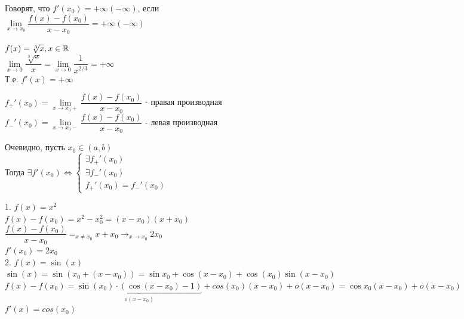 \begin{definition}
	Говорят, что $ f'(x_0) = +\infty (-\infty) $, если \\
	$ \lim\limits_{x \rightarrow x_0} \dfrac{f(x) - f(x_0)}{x - x_0} =  +\infty (-\infty) $
\end{definition}

\begin{example}
	$ f(x) = \sqrt[3]{x}, x \in \mathbb{R} $ \\
	$ \lim\limits_{x \rightarrow 0} \dfrac{\sqrt[3]{x}}{x} =  \lim\limits_{x \rightarrow 0} \dfrac{1}{x^{2/3}} = +\infty $ \\
	Т.е. $ f'(x) = +\infty $ 
\end{example}

\begin{definition}
	$ f_+' (x_0) = \lim\limits_{x \rightarrow x_0+} \dfrac{f(x) - f(x_0)}{x - x_0} $ - правая производная \\
	$ f_-' (x_0) = \lim\limits_{x \rightarrow x_0-} \dfrac{f(x) - f(x_0)}{x - x_0} $ - левая производная \\
\end{definition}

Очевидно, пусть $ x_0 \in (a, b) $ \\ %
Тогда  $ \exists f'(x_0) \Leftrightarrow \left\{ \begin{array}{ll}
	\exists f_+' (x_0) \\
	\exists f_-' (x_0) \\
	f_+' (x_0) = f_-' (x_0) 
\end{array} \right. $
\begin{example}
	1. $ f(x) = x^2 $ \\
	$ f(x) - f(x_0) = x^2 - x_0^2 = (x-x_0)(x+x_0) $ \\
	$  \dfrac{f(x) - f(x_0)}{x - x_0} =_{x \neq x_0} x + x_0 \rightarrow_{x \rightarrow x_0} 2x_0  $\\
	$ f'(x_0) = 2x_0 $ \\
	2. $ f(x) = \sin(x) $ \\
	$ \sin(x) = \sin(x_0 + (x - x_0))  = \sin x_0 + \cos(x - x_0) + \cos(x_0) \sin(x-x_0) $ \\
	$ f(x) - f(x_0) = \underbrace{\sin(x_0) \cdot (\cos(x-x_0) - 1)}_{o(x-x_0)} + cos(x_0) (x- x_0) + o(x-x_0)  = \cos x_0 (x - x_0) + o(x - x_0) $ \\
	$ f'(x) = cos(x_0) $ 
\end{example}

